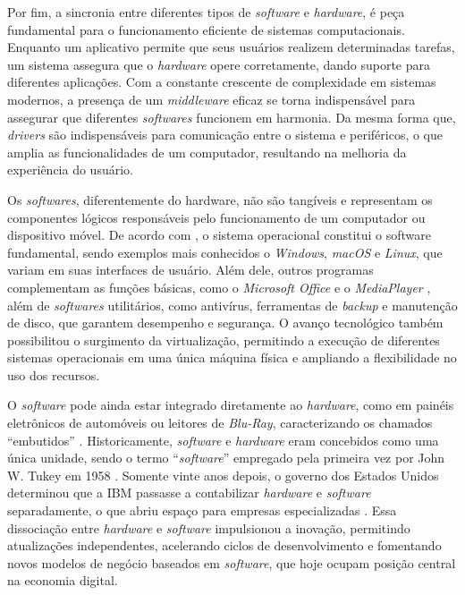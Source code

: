\documentclass[english,brazilian]{UNISINOSartigo} %
\begin{document}
Por fim, a sincronia entre diferentes tipos de \textit{software} e \textit{hardware}, é peça fundamental para o funcionamento eficiente de sistemas computacionais. Enquanto um aplicativo permite que seus usuários realizem determinadas tarefas, um sistema assegura que o \textit{hardware} opere corretamente, dando suporte para diferentes aplicações. Com a constante crescente de complexidade em sistemas modernos, a presença de um \textit{middleware} eficaz se torna indispensável para assegurar que diferentes \textit{softwares} funcionem em harmonia. Da mesma forma que, \textit{drivers} são indispensáveis para comunicação entre o sistema e periféricos, o que amplia as funcionalidades de um computador, resultando na melhoria da experiência do usuário.

Os \textit{softwares}, diferentemente do hardware, não são tangíveis e representam os componentes lógicos responsáveis pelo funcionamento de um computador ou dispositivo móvel. De acordo com , o sistema operacional constitui o software fundamental, sendo exemplos mais conhecidos o \textit{Windows}, \textit{macOS} e \textit{Linux}, que variam em suas interfaces de usuário. Além dele, outros programas complementam as funções básicas, como o \textit{Microsoft Office} e o \textit{MediaPlayer} \cite{neto2019}, além de \textit{softwares} utilitários, como antivírus, ferramentas de \textit{backup} e manutenção de disco, que garantem desempenho e segurança. O avanço tecnológico também possibilitou o surgimento da virtualização, permitindo a execução de diferentes sistemas operacionais em uma única máquina física e ampliando a flexibilidade no uso dos recursos.

O \textit{software} pode ainda estar integrado diretamente ao \textit{hardware}, como em painéis eletrônicos de automóveis ou leitores de \textit{Blu-Ray}, caracterizando os chamados “embutidos” \cite{coutinho2021}. Historicamente, \textit{software} e \textit{hardware} eram concebidos como uma única unidade, sendo o termo “\textit{software}” empregado pela primeira vez por John W. Tukey em 1958 \cite{maynard2015}. Somente vinte anos depois, o governo dos Estados Unidos determinou que a IBM passasse a contabilizar \textit{hardware} e \textit{software} separadamente, o que abriu espaço para empresas especializadas \cite{sakurai2018}. Essa dissociação entre \textit{hardware} e \textit{software} impulsionou a inovação, permitindo atualizações independentes, acelerando ciclos de desenvolvimento e fomentando novos modelos de negócio baseados em \textit{software}, que hoje ocupam posição central na economia digital.
\end{document}
